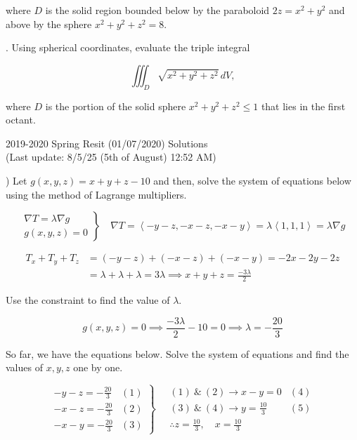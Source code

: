 \documentclass{article}
\begin{document}
\hfill

\noindent where $D$ is the solid region bounded below by the paraboloid $2z=x^2+y^2$ and above by the sphere $x^2+y^2+z^2=8$.

\hfill

. Using spherical coordinates, evaluate the triple integral

\[\iiint_D\sqrt{x^2+y^2+z^2}\,dV,\]

\hfill

\noindent where $D$ is the portion of the solid sphere $x^2+y^2+z^2\leq1$ that lies in the first octant.

\newpage

\begin{center}
2019-2020 Spring Resit (01/07/2020) Solutions\\
(Last update: 8/5/25 (5th of August) 12:52 AM)
\end{center}

) Let $g(x,y,z)=x+y+z-10$ and then, solve the system of equations below using the method of Lagrange multipliers.

\[
\left.
\begin{array}{ll}
\displaystyle\nabla T =\lambda \nabla g\\
\displaystyle g(x,y,z) = 0
\end{array}
\right\}\quad
\nabla T = \left\langle-y-z,-x-z,-x-y\right\rangle=\lambda\left\langle1,1,1\right\rangle= \lambda\nabla g
\]

\begin{align*}T_x+T_y + T_z&=(-y-z) +(-x-z) +(-x-y)=-2x-2y-2z\\&=\lambda+\lambda+\lambda=3\lambda\implies x+y+z=\frac{-3\lambda}{2}\end{align*}

\hfill

\noindent Use the constraint to find the value of $\lambda$.

\[g(x,y,z) = 0 \implies \frac{-3\lambda}{2}-10=0\implies \lambda=-\frac{20}{3}\]

\hfill

\noindent So far, we have the equations below. Solve the system of equations and find the values of $x,y,z$ one by one.

\[
\left.
\begin{array}{ll}
\displaystyle -y-z=-\frac{20}{3}&(1)\\[0.5cm]
\displaystyle -x-z=-\frac{20}{3}&(2)\\[0.5cm]
\displaystyle -x-y=-\frac{20}{3}&(3)
\end{array}
\right\}\quad
\begin{array}{ll}
\displaystyle (1)\:\&\:(2)\rightarrow x-y=0 & (4) \\[0.2cm]
\displaystyle (3)\:\&\:(4)\rightarrow y=\frac{10}{3}&(5)\\[0.5cm]
\displaystyle\therefore z=\frac{10}{3},\quad x=\frac{10}{3}
\end{array}
\]
\end{document}
